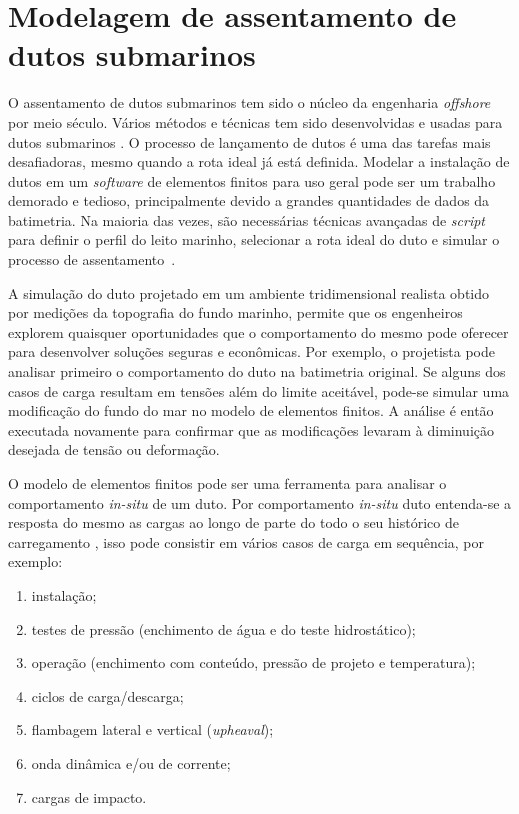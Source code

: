 \chapter{Modelagem de assentamento de dutos submarinos}
\label{chap:assentamento}

O assentamento de dutos submarinos tem sido o núcleo da engenharia \textit{offshore} por meio século.
Vários métodos e técnicas tem sido desenvolvidas e usadas para dutos submarinos \cite{Ivic2016}.
O processo de lançamento de dutos é uma das tarefas mais desafiadoras, mesmo quando a rota ideal já está definida.
Modelar a instalação de dutos em um \textit{software} de elementos finitos para uso geral pode ser um trabalho demorado e tedioso, principalmente devido a grandes quantidades de dados da batimetria.
Na maioria das vezes, são necessárias técnicas avançadas de \textit{script} para definir o perfil do leito marinho, selecionar a rota ideal do duto e simular o processo de assentamento~\cite{VandenAbeele2013}.

A simulação do duto projetado em um ambiente tridimensional realista obtido por medições da topografia do fundo marinho, permite que os engenheiros explorem quaisquer oportunidades que o comportamento do mesmo pode oferecer para desenvolver soluções seguras e econômicas.
Por exemplo, o projetista pode analisar primeiro o comportamento do duto na batimetria original.
Se alguns dos casos de carga resultam em tensões além do limite aceitável, pode-se simular uma modificação do fundo do mar no modelo de elementos finitos.
A análise é então executada novamente para confirmar que as modificações levaram à diminuição desejada de tensão ou deformação.

O modelo de elementos finitos pode ser uma ferramenta para analisar o comportamento \textit{in-situ} de um duto.
Por comportamento \textit{in-situ} duto entenda-se a resposta do mesmo as cargas ao longo de parte do todo o seu histórico de carregamento \cite{Bai2014}, isso pode consistir em vários casos de carga em sequência, por exemplo:

\begin{enumerate}
    \item instalação;
    \item testes de pressão (enchimento de água e do teste hidrostático);
    \item operação (enchimento com conteúdo, pressão de projeto e temperatura);
    \item ciclos de carga/descarga;
    \item flambagem lateral e vertical (\textit{upheaval});
    \item onda dinâmica e/ou de corrente;
    \item cargas de impacto.
\end{enumerate}

